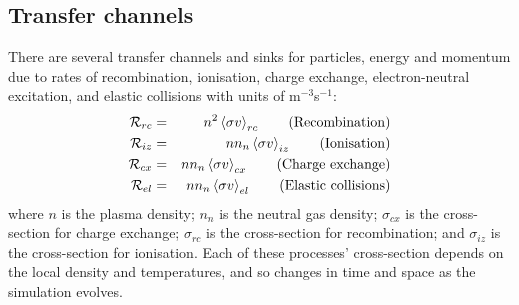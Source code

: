 \documentclass[12pt,a4paper]{article}
\begin{document}
\subsection{Transfer channels}

There are several transfer channels and sinks for particles, energy and momentum due to rates
of recombination, ionisation, charge exchange, electron-neutral excitation, and elastic collisions with units of m$^{-3}$s$^{-1}$:
\begin{eqnarray*}
  \mathcal{R}_{rc} &=& n^2\left<\sigma v\right>_{rc}   \qquad \mbox{\textrm{(Recombination)}} \\
  \mathcal{R}_{iz} &=&  nn_n\left<\sigma v\right>_{iz} \qquad \mbox{\textrm{(Ionisation)}} \\
  \mathcal{R}_{cx} &=& nn_n\left<\sigma v\right>_{cx} \qquad \mbox{\textrm{(Charge exchange)}} \\
  \mathcal{R}_{el} &=& nn_n\left<\sigma v\right>_{el} \qquad \mbox{\textrm{(Elastic collisions)}}
\end{eqnarray*}
where $n$ is the plasma density; $n_n$ is the neutral gas density; $\sigma_{cx}$ is the cross-section for charge exchange; $\sigma_{rc}$ is the cross-section for recombination;
and $\sigma_{iz}$ is the cross-section for ionisation.
Each of these processes' cross-section depends on the
local density and temperatures, and so changes in time and space as the simulation evolves.
\end{document}
